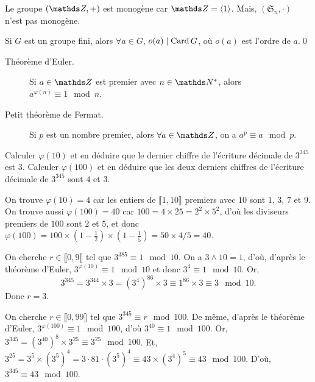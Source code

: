 \begin{exmn}
	Le groupe $(\Z, +)$ est monogène car $\Z = \langle 1 \rangle$.
	Mais, $(\mathfrak{S}_n, \cdot)$ n'est pas monogène.
\end{exmn}

\begin{prop}
	Si $G$ est un groupe fini, alors $\forall a \in G$, $o(a)  \mid \operatorname{Card} G$, où $o(a)$ est l'ordre de $a$.\qed
\end{prop}

\begin{crlr}
	\begin{description}
		\item[Théorème d'Euler.] Si $a \in \Z$ est premier avec $n \in \N^*$, alors $a^{\varphi(n)} \equiv 1 \mod n$.
		\item[Petit théorème de Fermat.] Si $p$ est un nombre premier, alors $\forall a \in \Z$, on a $a^p \equiv a \mod p$.
	\end{description}
\end{crlr}

\begin{exo}
	\begin{slshape}
		Calculer $\varphi(10)$ et en déduire que le dernier chiffre de l'écriture décimale de $3^{345}$ est $3$.
		Calculer $\varphi(100)$ et en déduire que les deux derniers chiffres de l'écriture décimale de $3^{345}$ sont $4$ et $3$.
	\end{slshape}

	On trouve $\varphi(10) = 4$ car les entiers de $\llbracket 1,10 \rrbracket$ premiers avec $10$ sont $1$, $3$, $7$ et $9$.
	On trouve aussi $\varphi(100) = 40$ car $100 = 4 \times 25 = 2^2 \times 5^2$, d'où les diviseurs premiers de $100$ sont $2$ et $5$, et donc $\varphi(100) = 100 \times \left(1 - \frac{1}{2}\right) \times \left( 1 - \frac{1}{5} \right) = 50 \times 4 / 5 = 40$.

	On cherche $r \in \llbracket 0,9 \rrbracket$ tel que $3^{385} \equiv 1 \mod {10}$.
	On a $3 \wedge 10 = 1$, d'où, d'après le théorème d'Euler, $3^{\varphi(10)} \equiv 1 \mod 10$ et donc $3^4 \equiv 1 \mod 10$.
	Or, \[
		3^{345} = 3^{344} \times 3 = (3^4)^{86} \times 3 \equiv 1^{86} \times 3 \equiv 3 \mod {10}
	.\]Donc $r = 3$.

	On cherche $r \in \llbracket 0,99 \rrbracket$ tel que $3^{345} \equiv r \mod {100}$.
	De même, d'après le théorème d'Euler, $3^{\varphi(100)} \equiv 1 \mod{100}$, d'où $3^{40} \equiv 1 \mod {100}$.
	Or, $3^{345} = (3^{40})^{8} \times 3^{25}\equiv 3^{25} \mod{100}$.
	Et, $3^{25} = 3^5 \times (3^5)^4 = 3 \cdot 81 \cdot (3^5)^4 \equiv 43 \times (3^4)^5 \equiv 43 \mod {100}$.
	D'où, $3^{345} \equiv 43 \mod {100}$.
\end{exo}

